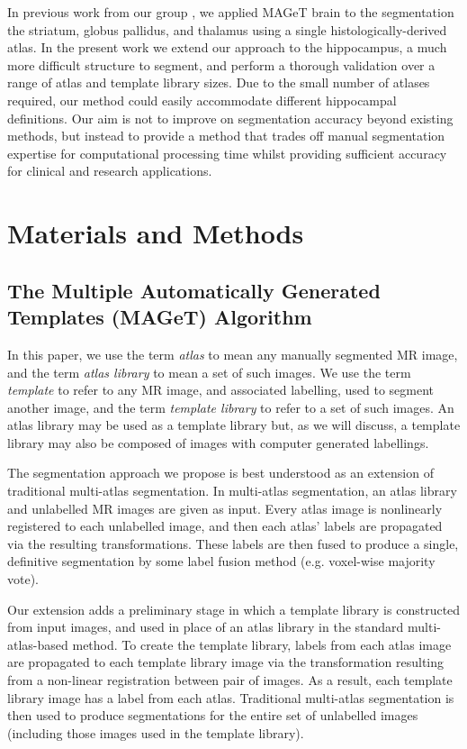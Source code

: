 \documentclass{article}\usepackage{graphicx, color}
\begin{document}
In previous work from our group \cite{Chakravarty2011}, we applied MAGeT brain
to the segmentation the striatum, globus pallidus, and thalamus using a single
histologically-derived atlas. In the present work we extend our approach to the
hippocampus, a much more difficult structure to segment, and perform a thorough
validation over a range of atlas and template library sizes. Due to the small
number of atlases required, our method could easily accommodate different
hippocampal definitions. Our aim is not to improve on segmentation accuracy
beyond existing methods, but instead to provide a method that trades off manual
segmentation expertise for computational processing time whilst providing
sufficient accuracy for clinical and research applications.


\section{Materials and Methods} 
\subsection{The Multiple Automatically Generated Templates (MAGeT) Algorithm}

In this paper, we use the term {\it atlas} to mean any manually segmented MR
image, and the term {\it atlas library} to mean a set of such images.  We use
the term {\it template} to refer to any MR image, and associated labelling,
used to segment another image, and the term {\it template library} to refer to
a set of such images.  An atlas library may be used as a template library but,
as we will discuss, a template library may also be composed of images with
computer generated labellings. 

The segmentation approach we propose is best understood as an extension of
traditional multi-atlas segmentation.  In multi-atlas segmentation, an atlas
library and unlabelled MR images are given as input.  Every atlas image is
nonlinearly registered to each unlabelled image, and then each atlas' labels
are propagated via the resulting transformations.  These labels are then fused
to produce a single, definitive segmentation by some label fusion method (e.g.
voxel-wise majority vote). 

Our extension adds a preliminary stage in which a template library is
constructed from input images, and used in place of an atlas library in the
standard multi-atlas-based method.  To create the template library, labels from
each atlas image are propagated to each template library image via the
transformation resulting from a non-linear registration between pair of images.
As a result, each template library image has a label from each atlas.
Traditional multi-atlas segmentation is then used to produce segmentations for
the entire set of unlabelled images (including those images used in the
template library). 
\end{document}
